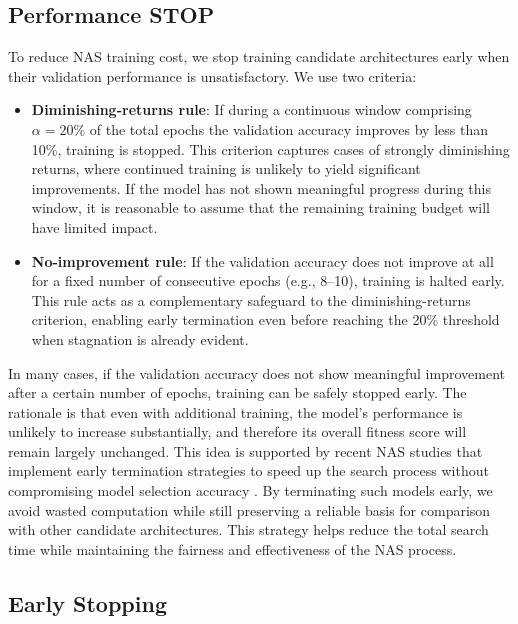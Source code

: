 \clearpage

\subsection{Performance STOP}
\label{sec:performance_stop}
To reduce NAS training cost, we stop training candidate architectures early when their validation performance is unsatisfactory. We use two criteria:
\begin{itemize}

\item \textbf{Diminishing-returns rule}: If during a continuous window comprising $\alpha = 20\%$ of the total epochs the validation accuracy improves by less than 10\%, training is stopped. This criterion captures cases of strongly diminishing returns, where continued training is unlikely to yield significant improvements. If the model has not shown meaningful progress during this window, it is reasonable to assume that the remaining training budget will have limited impact.

\item \textbf{No-improvement rule}: If the validation accuracy does not improve at all for a fixed number of consecutive epochs (e.g., 8–10), training is halted early. This rule acts as a complementary safeguard to the diminishing-returns criterion, enabling early termination even before reaching the 20\% threshold when stagnation is already evident.


\end{itemize}

In many cases, if the validation accuracy does not show meaningful improvement after a certain number of epochs, training can be safely stopped early. The rationale is that even with additional training, the model’s performance is unlikely to increase substantially, and therefore its overall fitness score will remain largely unchanged. This idea is supported by recent NAS studies that implement early termination strategies to speed up the search process without compromising model selection accuracy \cite{li2020random}. By terminating such models early, we avoid wasted computation while still preserving a reliable basis for comparison with other candidate architectures. This strategy helps reduce the total search time while maintaining the fairness and effectiveness of the NAS process.




\subsection{Early Stopping}

